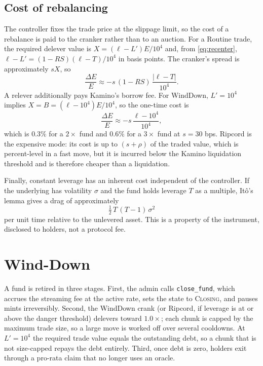 \documentclass[11pt]{article}
\theoremstyle{remark}
\newcommand{\BPS}{10^{4}}
\newcommand{\NAV}{E}
\newcommand{\Lev}{\ell}
\begin{document}
\subsection{Cost of rebalancing}
\label{sec:cost}

The controller fixes the trade price at the slippage limit, so the cost of a rebalance is paid to the cranker rather than to an auction. For a Routine trade, the required delever value is $X = (\Lev - L')\NAV/\BPS$ and, from \eqref{eq:recenter}, $\Lev - L' = (1 - RS)(\Lev - T)/\BPS$ in basis points. The cranker's spread is approximately $sX$, so
\begin{equation}
\frac{\Delta\NAV}{\NAV} \approx -s\,(1 - RS)\,\frac{|\Lev - T|}{\BPS}.
\label{eq:routine-cost}
\end{equation}
A relever additionally pays Kamino's borrow fee. For WindDown, $L' = \BPS$ implies $X = B = (\Lev - \BPS)\NAV/\BPS$, so the one-time cost is
\begin{equation}
\frac{\Delta\NAV}{\NAV} \approx -s\,\frac{\Lev - \BPS}{\BPS},
\label{eq:winddown-cost}
\end{equation}
which is $0.3\%$ for a $2\times$ fund and $0.6\%$ for a $3\times$ fund at $s = 30$ bps. Ripcord is the expensive mode: its cost is up to $(s + \rho)$ of the traded value, which is percent-level in a fast move, but it is incurred below the Kamino liquidation threshold and is therefore cheaper than a liquidation.

Finally, constant leverage has an inherent cost independent of the controller. If the underlying has volatility $\sigma$ and the fund holds leverage $T$ as a multiple, It\^o's lemma gives a drag of approximately
\begin{equation}
\tfrac{1}{2}\,T\,(T - 1)\,\sigma^{2}
\label{eq:drag}
\end{equation}
per unit time relative to the unlevered asset. This is a property of the instrument, disclosed to holders, not a protocol fee.

\section{Wind-Down}

A fund is retired in three stages. First, the admin calls \texttt{close\_fund}, which accrues the streaming fee at the active rate, sets the state to \textsc{Closing}, and pauses mints irreversibly. Second, the WindDown crank (or Ripcord, if leverage is at or above the danger threshold) delevers toward $1.0\times$; each chunk is capped by the maximum trade size, so a large move is worked off over several cooldowns. At $L' = \BPS$ the required trade value equals the outstanding debt, so a chunk that is not size-capped repays the debt entirely. Third, once debt is zero, holders exit through a pro-rata claim that no longer uses an oracle.
\end{document}
